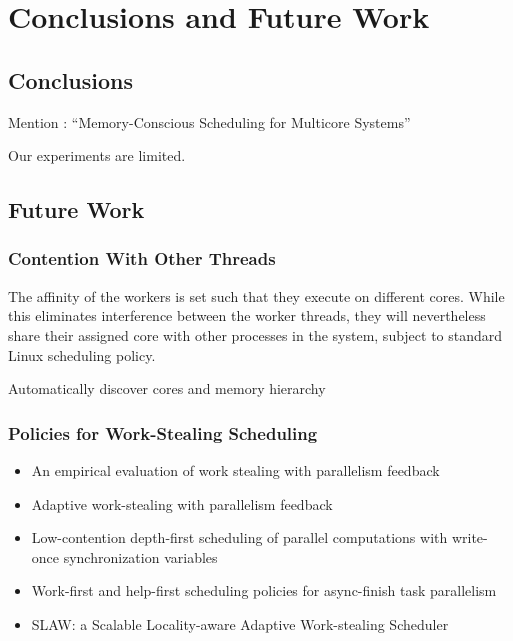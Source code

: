
\chapter{Conclusions and Future Work}
\label{chap:locality-conclusions}

\section{Conclusions}
\label{sec:locality-conclusions-and-future-work-conclusions}


Mention \textcite{Majo2010}: ``Memory-Conscious Scheduling for Multicore Systems''

Our experiments are limited.


\section{Future Work}
\label{sec:locality-conclusions-and-future-work-future-work}

\subsection{Contention With Other Threads}

The affinity of the workers is set such that they execute on different
cores. While this eliminates interference between the worker threads,
they will nevertheless share their assigned core with other processes
in the system, subject to standard Linux scheduling policy.

Automatically discover cores and memory hierarchy

\subsection{Policies for Work-Stealing Scheduling}

\begin{itemize}
\item[\textbullet] An empirical evaluation of work stealing with
  parallelism feedback \cite{Agrawal2006}
\item[\textbullet] Adaptive work-stealing with parallelism feedback
  \cite{Agrawal2007}
\item[\textbullet] Low-contention depth-first scheduling of parallel
  computations with write-once synchronization variables
  \cite{Fatourou2001}
\item[\textbullet] Work-first and help-first scheduling policies for
  async-finish task parallelism \cite{Guo2009}
\item[\textbullet] SLAW: a Scalable Locality-aware Adaptive
  Work-stealing Scheduler \cite{Guo2010}
\end{itemize}


